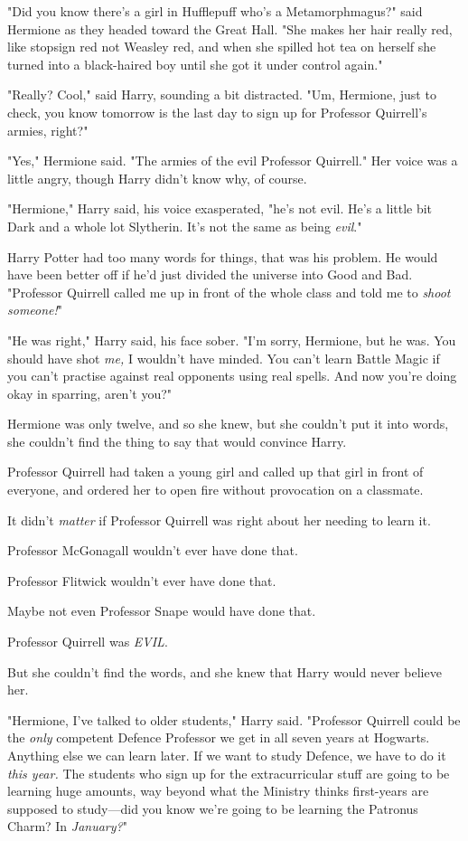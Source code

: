 "Did you know there's a girl in Hufflepuff who's a Metamorphmagus?" said
Hermione as they headed toward the Great Hall. "She makes her hair really red,
like stopsign red not Weasley red, and when she spilled hot tea on herself she
turned into a black-haired boy until she got it under control again."

"Really? Cool," said Harry, sounding a bit distracted. "Um, Hermione, just to
check, you know tomorrow is the last day to sign up for Professor Quirrell's
armies, right?"

"Yes," Hermione said. "The armies of the evil Professor Quirrell." Her voice
was a little angry, though Harry didn't know why, of course.

"Hermione," Harry said, his voice exasperated, "he's not evil. He's a little
bit Dark and a whole lot Slytherin. It's not the same as being \emph{evil}."

Harry Potter had too many words for things, that was his problem. He would have
been better off if he'd just divided the universe into Good and Bad. "Professor
Quirrell called me up in front of the whole class and told me to \emph{shoot
someone!}"

"He was right," Harry said, his face sober. "I'm sorry, Hermione, but he was.
You should have shot \emph{me,} I wouldn't have minded. You can't learn Battle
Magic if you can't practise against real opponents using real spells. And now
you're doing okay in sparring, aren't you?"

Hermione was only twelve, and so she knew, but she couldn't put it into words,
she couldn't find the thing to say that would convince Harry.

Professor Quirrell had taken a young girl and called up that girl in front of
everyone, and ordered her to open fire without provocation on a classmate.

It didn't \emph{matter} if Professor Quirrell was right about her needing to
learn it.

Professor McGonagall wouldn't ever have done that.

Professor Flitwick wouldn't ever have done that.

Maybe not even Professor Snape would have done that.

Professor Quirrell was \emph{EVIL}.

But she couldn't find the words, and she knew that Harry would never believe
her.

"Hermione, I've talked to older students," Harry said. "Professor Quirrell
could be the \emph{only} competent Defence Professor we get in all seven years
at Hogwarts. Anything else we can learn later. If we want to study Defence, we
have to do it \emph{this year.} The students who sign up for the
extracurricular stuff are going to be learning huge amounts, way beyond what
the Ministry thinks first-years are supposed to study---did you know we're
going to be learning the Patronus Charm? In \emph{January?}"

